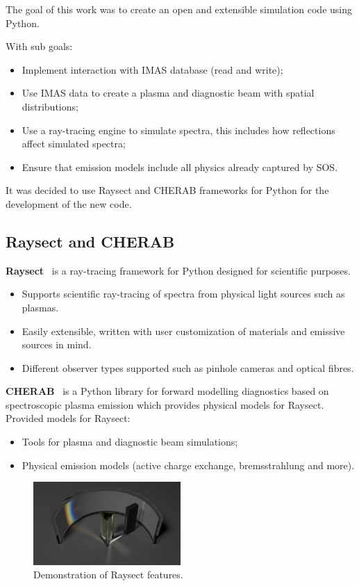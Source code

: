 \documentclass[../main.tex]{subfiles}
\begin{document}
The goal of this work was to create an open and extensible simulation code using Python.

With sub goals:
\begin{itemize}
    \item Implement interaction with IMAS database (read and write);
    \item Use IMAS data to create a plasma and diagnostic beam with spatial distributions;
    \item Use a ray-tracing engine to simulate spectra, this includes how reflections affect simulated spectra;
    \item Ensure that emission models include all physics already captured by SOS.
\end{itemize}

It was decided to use Raysect and CHERAB frameworks for Python for the development of the new code.

\subsection{Raysect and CHERAB}

\textbf{Raysect}~\cite{raysect} is a ray-tracing framework for Python designed for scientific purposes.
\begin{itemize}
    \item Supports scientific ray-tracing of spectra from physical light sources such as plasmas.
    \item Easily extensible, written with user customization of materials and emissive sources in mind.
    \item Different observer types supported such as pinhole cameras and optical fibres.
\end{itemize}

\textbf{CHERAB}~\cite{cherab} is a Python library for forward modelling diagnostics based on spectroscopic plasma emission which provides physical models for Raysect.
Provided models for Raysect:
\begin{itemize}
    \item Tools for plasma and diagnostic beam simulations;
    \item Physical emission models (active charge exchange, bremsstrahlung and more).
\end{itemize}

\begin{figure}
    \centering
    \includegraphics[width=0.5\textwidth]{images/raysect_demo}
    \caption{Demonstration of Raysect features.}%
    \label{fig:raysect_demo}
\end{figure}
\end{document}
